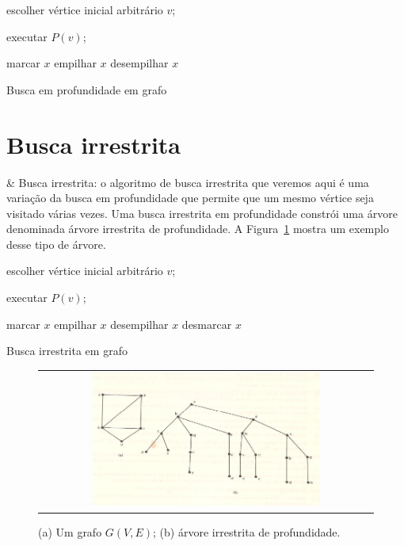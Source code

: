 \begin{algorithm}[H]
\SetAlgoLined
{}
  escolher vértice inicial arbitrário $v$;

  executar $P(v)$;

  {
    marcar $x$\;
    empilhar $x$\;
    desempilhar $x$\;
  }
  \caption{Busca em profundidade em grafo}
\end{algorithm}

\section{Busca irrestrita}

\begin{easylist}

  & Busca irrestrita: o algoritmo de busca irrestrita que veremos aqui é uma variação da busca em profundidade que permite que um mesmo vértice seja visitado várias vezes. Uma busca irrestrita em profundidade constrói uma árvore denominada árvore irrestrita de profundidade. A Figura~\ref{fig:3:1} mostra um exemplo desse tipo de árvore.

\end{easylist}


\begin{algorithm}[H]
\SetAlgoLined
{}
  escolher vértice inicial arbitrário $v$;

  executar $P(v)$;

  {
    marcar $x$\;
    empilhar $x$\;
    desempilhar $x$\;
    desmarcar $x$\;
  }
  \caption{Busca irrestrita em grafo}
\end{algorithm}


\begin{figure}[b]
  \begin{center}
    \begin{tabular}{c}
      \includegraphics[width=0.7\textwidth]{images/03/unrestricted.png}
    \end{tabular}
  \end{center}
  \caption{\label{fig:3:1} (a) Um grafo $G(V,E)$; (b) árvore irrestrita de profundidade.}
\end{figure}
  





